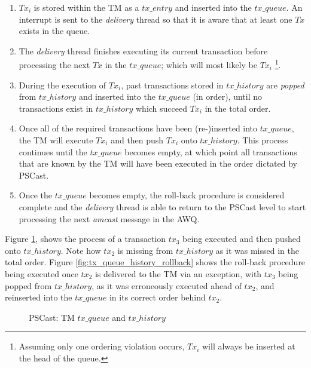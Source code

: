     \begin{enumerate}
        \item    $Tx_i$ is stored within the TM as a $tx\_entry$ and inserted into the $tx\_queue$.  An interrupt is sent to the \emph{delivery} thread so that it is aware that at least one $Tx$ exists in the queue.  
        
        \item    The \emph{delivery} thread finishes executing its current transaction before processing the next $Tx$ in the $tx\_queue$; which will most likely be $Tx_i$ \footnote{Assuming only one ordering violation occurs, $Tx_i$ will always be inserted at the head of the queue.}.
        
        \item    During the execution of $Tx_i$, past transactions stored in $tx\_history$ are \emph{popped} from $tx\_history$ and inserted into the $tx\_queue$ (in order), until no transactions exist in $tx\_history$ which succeed $Tx_i$ in the total order.
        
        \item    Once all of the required transactions have been (re-)inserted into $tx\_queue$, the TM will execute $Tx_i$ and then push $Tx_i$ onto $tx\_history$.  This process continues until the $tx\_queue$ becomes empty, at which point all transactions that are known by the TM will have been executed in the order dictated by \textsf{PSCast}.  
        
        \item    Once the $tx\_queue$ becomes empty, the roll-back procedure is considered complete and the \emph{delivery} thread is able to return to the \textsf{PSCast} level to start processing the next \emph{amcast} message in the AWQ.  
    \end{enumerate}        
    
    Figure \ref{fig:tx_queue_history}, shows the process of a transaction $tx_3$ being executed and then pushed onto $tx\_history$.  Note how $tx_2$ is missing from $tx\_history$ as it was missed in the total order.  Figure \ref{fig:tx_queue_history_rollback} shows the roll-back procedure being executed once $tx_2$ is delivered to the TM via an exception, with $tx_3$ being popped from $tx\_history$, as it was erroneously executed ahead of $tx_2$, and reinserted into the $tx\_queue$ in its correct order behind $tx_2$.  
    
    \begin{figure}[h] 
        \centering
         \caption[PSCast: TM $tx\_queue$ and $tx\_history$]{PSCast: TM $tx\_queue$ and $tx\_history$}
         \label{fig:tx_queue_history}
    \end{figure}      
    
